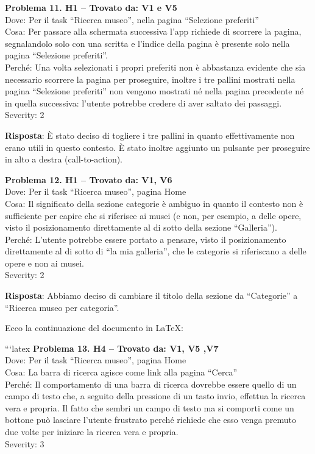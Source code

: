 \documentclass{article}
\begin{document}
\noindent \textbf{Problema 11. H1 – Trovato da: V1 e V5} \\
Dove: Per il task “Ricerca museo”, nella pagina “Selezione preferiti” \\
Cosa: Per passare alla schermata successiva l’app richiede di scorrere la pagina, segnalandolo solo con una scritta e l’indice della pagina è presente solo nella pagina “Selezione preferiti”. \\
Perché: Una volta selezionati i propri preferiti non è abbastanza evidente che sia necessario scorrere la pagina per proseguire, inoltre i tre pallini mostrati nella pagina “Selezione preferiti” non vengono mostrati né nella pagina precedente né in quella successiva: l’utente potrebbe credere di aver saltato dei passaggi. \\
Severity: 2

\noindent \textbf{Risposta}: È stato deciso di togliere i tre pallini in quanto effettivamente non erano utili in questo contesto. È stato inoltre aggiunto un pulsante per proseguire in alto a destra (call-to-action).

\noindent \textbf{Problema 12. H1 – Trovato da: V1, V6} \\
Dove: Per il task “Ricerca museo”, pagina Home \\
Cosa: Il significato della sezione categorie è ambiguo in quanto il contesto non è sufficiente per capire che si riferisce ai musei (e non, per esempio, a delle opere, visto il posizionamento direttamente al di sotto della sezione “Galleria”). \\
Perché: L’utente potrebbe essere portato a pensare, visto il posizionamento direttamente al di sotto di “la mia galleria”, che le categorie si riferiscano a delle opere e non ai musei. \\
Severity: 2

\noindent \textbf{Risposta}: Abbiamo deciso di cambiare il titolo della sezione da “Categorie” a “Ricerca museo per categoria”.

Ecco la continuazione del documento in LaTeX:

```latex
\noindent \textbf{Problema 13. H4 – Trovato da: V1, V5 ,V7} \\
Dove: Per il task “Ricerca museo”, pagina Home \\
Cosa: La barra di ricerca agisce come link alla pagina “Cerca” \\
Perché: Il comportamento di una barra di ricerca dovrebbe essere quello di un campo di testo che, a seguito della pressione di un tasto invio, effettua la ricerca vera e propria. Il fatto che sembri un campo di testo ma si comporti come un bottone può lasciare l’utente frustrato perché richiede che esso venga premuto due volte per iniziare la ricerca vera e propria. \\
Severity: 3
\end{document}
